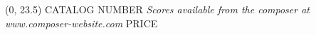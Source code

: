 \documentclass[10pt]{article}
\begin{document}
\begin{textblock}{23}(0, 23.5)
CATALOG NUMBER \hfill
\textit{Scores available from the composer at www.composer-website.com} \hfill
PRICE
\end{textblock}
\end{document}
